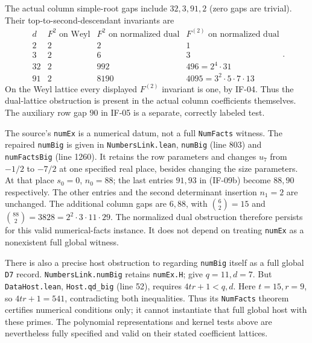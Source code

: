 \documentclass[11pt,a4paper]{article}
\theoremstyle{definition}
\theoremstyle{remark}
\begin{document}
The actual column simple-root gaps include $32,3,91,2$ (zero gaps are
trivial). Their top-to-second-descendant invariants are
\[
\begin{array}{c|c|c|c}
 d&F^2\text{ on Weyl}&F^2\text{ on normalized dual}
       &F^{(2)}\text{ on normalized dual}\\\hline
 2&2&2&1\\
 3&2&6&3\\
 32&2&992&496=2^4\cdot31\\
 91&2&8190&4095=3^2\cdot5\cdot7\cdot13
\end{array}.                                                   \tag{IF-09e}
\]
On the Weyl lattice every displayed $F^{(2)}$ invariant is one, by
IF-04. Thus the dual-lattice obstruction is present in the actual
column coefficients themselves. The auxiliary row gap $90$ in IF-05
is a separate, correctly labeled test.

The source's \texttt{numEx} is a numerical datum, not a full
\texttt{NumFacts} witness. The repaired \texttt{numBig} is given in
\texttt{NumbersLink.lean}, \texttt{numBig} (line 803) and
\texttt{numFactsBig} (line 1260). It retains the row parameters and
changes $u_7$ from $-1/2$ to $-7/2$ at one specified real place, besides
changing the size parameters. At that place $s_0=0$, $n_0=88$;
the last entries $91,93$ in (IF-09b) become $88,90$ respectively.
The other entries and the second determinant insertion $n_1=2$
are unchanged. The additional column gaps are $6,88$, with
$\binom62=15$ and $\binom{88}2=3828=2^2\cdot3\cdot11\cdot29$.
The normalized dual obstruction therefore persists for this valid
numerical-facts instance. It does not depend on treating
\texttt{numEx} as a nonexistent full global witness.

There is also a precise host obstruction to regarding
\texttt{numBig} itself as a full global \texttt{D7} record.
\texttt{NumbersLink.numBig} retains \texttt{numEx.H};
 give $q=11,d=7$.
But \texttt{DataHost.lean}, \texttt{Host.qd\_big} (line 52), requires
$4tr+1<q,d$. Here $t=15,r=9$, so $4tr+1=541$, contradicting both
inequalities. Thus its \texttt{NumFacts} theorem certifies numerical
conditions only; it cannot instantiate that full global host with
these primes. The polynomial representations and kernel tests above
are nevertheless fully specified and valid on their stated coefficient
lattices.
\end{document}
